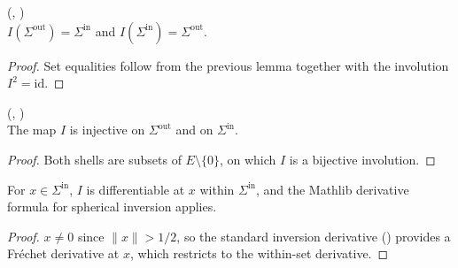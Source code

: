 \begin{lemma}
\label{lem:inversion_image_unitBallOuterShell}
\leanok
{}
(,
)\\
$I(\Sigma^{\mathrm{out}}) = \Sigma^{\mathrm{in}}$ and
$I(\Sigma^{\mathrm{in}}) = \Sigma^{\mathrm{out}}$.
\end{lemma}

\begin{proof}
\leanok
{}

Set equalities follow from the previous lemma together with the involution
$I^2 = \mathrm{id}$.
\end{proof}

\begin{lemma}
\label{lem:injOn_inversion_unitBallOuterShell}
\leanok
{}
(,
)\\
The map $I$ is injective on $\Sigma^{\mathrm{out}}$ and on $\Sigma^{\mathrm{in}}$.
\end{lemma}

\begin{proof}
\leanok

Both shells are subsets of $E\setminus\{0\}$, on which $I$ is a bijective
involution.
\end{proof}

\begin{lemma}
\label{lem:hasFDerivWithinAt_inversion_unitBallInnerShell}
\leanok
{}
For $x \in \Sigma^{\mathrm{in}}$, $I$ is differentiable at $x$ within
$\Sigma^{\mathrm{in}}$, and the Mathlib derivative formula for spherical
inversion applies.
\end{lemma}

\begin{proof}
\leanok

$x \neq 0$ since $\|x\| > 1/2$, so the standard inversion derivative
()
provides a Fr\'echet derivative at $x$, which restricts to the within-set
derivative.
\end{proof}

